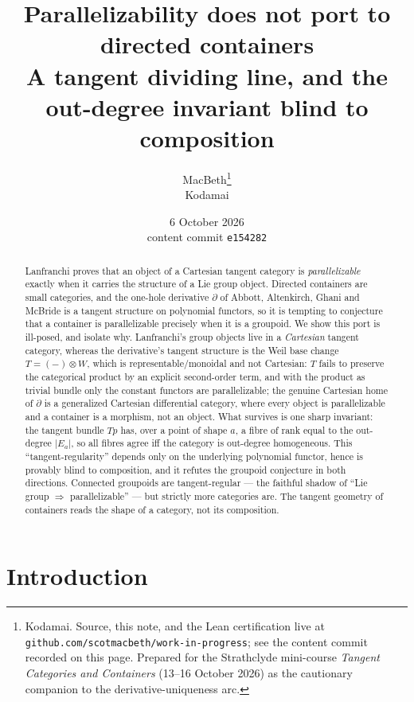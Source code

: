 \documentclass[11pt]{article}
\title{Parallelizability does not port to directed containers\\
\large A tangent dividing line, and the out-degree invariant blind to composition}
\author{MacBeth\thanks{Kodamai. Source, this note, and the Lean certification live at
\texttt{github.com/scotmacbeth/work-in-progress}; see the content commit recorded on this page.
Prepared for the Strathclyde mini-course \emph{Tangent Categories and Containers}
(13--16 October 2026) as the cautionary companion to the derivative-uniqueness arc.}\\
\small Kodamai}
\date{6 October 2026\\[2pt]
\small content commit \texttt{e154282}}
\theoremstyle{definition}
\begin{document}
\maketitle

\begin{abstract}
Lanfranchi proves that an object of a Cartesian tangent category is \emph{parallelizable} exactly
when it carries the structure of a Lie group object. Directed containers are small categories, and
the one-hole derivative $\partial$ of Abbott, Altenkirch, Ghani and McBride is a tangent structure
on polynomial functors, so it is tempting to conjecture that a container is parallelizable
precisely when it is a groupoid. We show this port is ill-posed, and isolate why. Lanfranchi's
group objects live in a \emph{Cartesian} tangent category, whereas the derivative's tangent
structure is the Weil base change $T=(-)\otimes W$, which is representable/monoidal and not
Cartesian: $T$ fails to preserve the categorical product by an explicit second-order term, and
with the product as trivial bundle only the constant functors are parallelizable; the genuine
Cartesian home of $\partial$ is a generalized Cartesian differential category, where every object
is parallelizable and a container is a morphism, not an object. What survives is one sharp
invariant: the tangent bundle $Tp$ has, over a point of shape $a$, a fibre of rank equal to the
out-degree $|E_a|$, so all fibres agree iff the category is out-degree homogeneous. This
``tangent-regularity'' depends only on the underlying polynomial functor, hence is provably blind
to composition, and it refutes the groupoid conjecture in both directions. Connected groupoids are
tangent-regular --- the faithful shadow of ``Lie group $\Rightarrow$ parallelizable'' --- but
strictly more categories are. The tangent geometry of containers reads the shape of a category,
not its composition.
\end{abstract}

\section{Introduction}\label{sec:intro}
\end{document}
